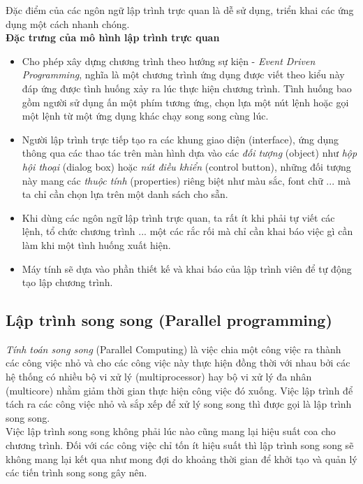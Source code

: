\documentclass[10pt, a4paper]{article}
\begin{document}
Đặc điểm của các ngôn ngữ lập trình trực quan là dễ sử dụng, triển khai các ứng dụng một cách nhanh chóng.\\

\textbf{Đặc trưng của mô hình lập trình trực quan}
\begin{itemize}
\item Cho phép xây dựng chương trình theo hướng sự kiện - \emph{Event Driven Programming}, nghĩa là một chương trình ứng dụng được viết theo kiểu này đáp ứng được tình huống xảy ra lúc thực hiện chương trình. Tình huống bao gồm người sử dụng ấn một phím tương ứng, chọn lựa một nút lệnh hoặc gọi một lệnh từ một ứng dụng khác chạy song song cùng lúc.
\item Người lập trình trực tiếp tạo ra các khung giao diện (interface), ứng dụng thông qua các thao tác trên màn hình dựa vào các \emph{đối tượng} (object) như \emph{hộp hội thoại} (dialog box) hoặc \emph{nút điều khiển} (control button), những đối tượng này mang các \emph{thuộc tính} (properties) riêng biệt như màu sắc, font chữ ... mà ta chỉ cần chọn lựa trên một danh sách cho sẵn.
\item Khi dùng các ngôn ngữ lập trình trực quan, ta rất ít khi phải tự viết các lệnh, tổ chức chương trình ... một các rắc rối mà chỉ cần khai báo việc gì cần làm khi một tình huống xuất hiện.
\item Máy tính sẽ dựa vào phần thiết kế và khai báo của lập trình viên để tự động tạo lập chương trình.
\end{itemize}

\subsection{Lập trình song song (Parallel programming)}

\emph{Tính toán song song} (Parallel Computing) là việc chia một công việc ra thành các công việc nhỏ và cho các công việc này thực hiện đồng thời với nhau bởi các hệ thống có nhiều bộ vi xử lý (multiprocessor) hay bộ vi xử lý đa nhân (multicore) nhằm giảm thời gian thực hiện công việc đó xuống. Việc lập trình để tách ra các công việc nhỏ và sắp xếp để xử lý song song thì được gọi là lập trình song song.\\

Việc lập trình song song không phải lúc nào cũng mang lại hiệu suất coa cho chương trình. Đối với các công việc chỉ tốn ít hiệu suất thì lập trình song song sẽ không mang lại kết qua như mong đợi do khoảng thời gian để khởi tạo và quản lý các tiến trình song song gây nên.
\end{document}
